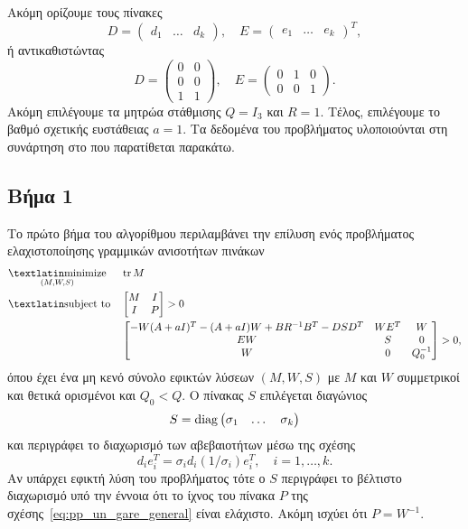Ακόμη ορίζουμε τους πίνακες
\[
    D = \begin{pmatrix} d_1 & \dots & d_k\end{pmatrix}, \quad
    E = \begin{pmatrix} e_1 & \dots & e_k\end{pmatrix}^T,
\]
ή αντικαθιστώντας
\[
    D =
    \begin{pmatrix}
        0 & 0 \\
        0 & 0 \\
        1 & 1
    \end{pmatrix}, \quad
    E =
    \begin{pmatrix}
        0 & 1 & 0 \\
        0 & 0 & 1
    \end{pmatrix}.
\]
Ακόμη επιλέγουμε τα μητρώα στάθμισης \( Q = I_3 \) και \( R = 1 \). Τέλος,
επιλέγουμε το βαθμό σχετικής ευστάθειας \( a = 1 \). Τα δεδομένα του
προβλήματος υλοποιούνται στη συνάρτηση  στο  που
παρατίθεται παρακάτω.
\eng{}

\subsection{Βήμα 1}
Το πρώτο βήμα του αλγορίθμου περιλαμβάνει την επίλυση ενός προβλήματος
ελαχιστοποίησης γραμμικών ανισοτήτων πινάκων
\begin{equation*}
    \begin{aligned}
        & \underset{
            (M, W, S)
        }{\mathtxt{minimize}}
        & & \tr M \\
        & \mathtxt{subject to}
        & &
        \begin{bmatrix}
            M & I \\
            I & P
        \end{bmatrix} > 0 \\
        &&&
        \begin{bmatrix}
            -W(A + aI)^T - (A + aI)W + BR^{-1}B^T
            - DSD^T & WE^T & W \\
            EW & S & 0 \\
            W & 0 & Q_0^{-1}\\
        \end{bmatrix} > 0,
    \end{aligned}
\end{equation*}
όπου έχει ένα μη κενό σύνολο εφικτών λύσεων \( (M, W, S) \) με \( M \) και \( W
\) συμμετρικοί και θετικά ορισμένοι και \( Q_0 < Q \). Ο πίνακας \( S \) επιλέγεται
διαγώνιος
\[
    S = \operatorname{diag}\begin{pmatrix} \sigma_1 & \dots & \sigma_k\end{pmatrix}
\]
και περιγράφει το διαχωρισμό των αβεβαιοτήτων μέσω της σχέσης
\begin{equation}\label{eq:pp_sep}
    d_ie_i^T = \sigma_i d_i (1/\sigma_i)e_i^T, \quad i = 1, \dots ,k.
\end{equation}
Αν υπάρχει εφικτή λύση του προβλήματος τότε ο \( S \) περιγράφει το βέλτιστο
διαχωρισμό υπό την έννοια ότι το ίχνος του πίνακα \( P \) της
σχέσης~\eqref{eq:pp_un_gare_general} είναι ελάχιστο. Ακόμη ισχύει ότι \( P =
W^{-1} \).

